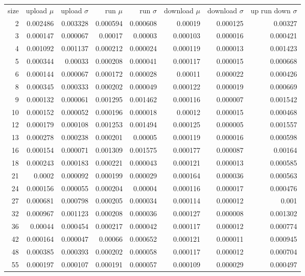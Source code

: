 \begin{longtable}{r r r r r r r r}
size & upload $\mu$  & upload $\sigma$ & run $\mu$ & run $\sigma$ & download $\mu$ & download $\sigma$ & up run down $\sigma$ \\
2 & 0.002486 & 0.003328 & 0.000594 & 0.000608 & 0.00019 & 0.000125 & 0.00327 \\
3 & 0.000147 & 0.000067 & 0.00017 & 0.00003 & 0.000103 & 0.000016 & 0.000421 \\
4 & 0.001092 & 0.001137 & 0.000212 & 0.000024 & 0.000119 & 0.000013 & 0.001423 \\
5 & 0.000344 & 0.00033 & 0.000208 & 0.000041 & 0.000117 & 0.000015 & 0.000668 \\
6 & 0.000144 & 0.000067 & 0.000172 & 0.000028 & 0.00011 & 0.000022 & 0.000426 \\
8 & 0.000345 & 0.000333 & 0.000202 & 0.000049 & 0.000122 & 0.000019 & 0.000669 \\
9 & 0.000132 & 0.000061 & 0.001295 & 0.001462 & 0.000116 & 0.000007 & 0.001542 \\
10 & 0.000152 & 0.000052 & 0.000196 & 0.000018 & 0.00012 & 0.000015 & 0.000468 \\
12 & 0.000179 & 0.000108 & 0.001253 & 0.001494 & 0.000125 & 0.000005 & 0.001557 \\
13 & 0.000278 & 0.000238 & 0.000201 & 0.00005 & 0.000119 & 0.000016 & 0.000598 \\
16 & 0.000154 & 0.000071 & 0.001309 & 0.001575 & 0.000177 & 0.000087 & 0.00164 \\
18 & 0.000243 & 0.000183 & 0.000221 & 0.000043 & 0.000121 & 0.000013 & 0.000585 \\
21 & 0.0002 & 0.000092 & 0.000199 & 0.000029 & 0.000164 & 0.000036 & 0.000563 \\
24 & 0.000156 & 0.000055 & 0.000204 & 0.00004 & 0.000116 & 0.000017 & 0.000476 \\
27 & 0.000681 & 0.000798 & 0.000205 & 0.000034 & 0.000114 & 0.000012 & 0.001 \\
32 & 0.000967 & 0.001123 & 0.000208 & 0.000036 & 0.000127 & 0.000008 & 0.001302 \\
36 & 0.00044 & 0.000454 & 0.000217 & 0.000042 & 0.000117 & 0.000012 & 0.000774 \\
42 & 0.000164 & 0.000047 & 0.00066 & 0.000652 & 0.000121 & 0.000011 & 0.000945 \\
48 & 0.000385 & 0.000393 & 0.000202 & 0.000058 & 0.000117 & 0.000012 & 0.000704 \\
55 & 0.000197 & 0.000107 & 0.000191 & 0.000057 & 0.000109 & 0.000029 & 0.000497 \\

\end{longtable}
